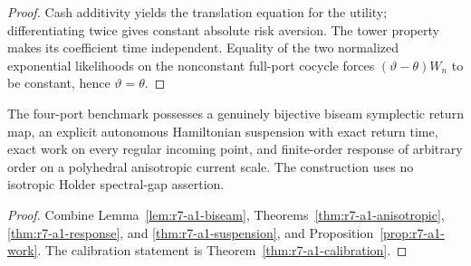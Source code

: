 \begin{proof}
Cash additivity yields the translation equation for the utility; differentiating
twice gives constant absolute risk aversion.  The tower property makes its
coefficient time independent.  Equality of the two normalized exponential
likelihoods on the nonconstant full-port cocycle forces
$(\vartheta-\theta)W_n$ to be constant, hence $\vartheta=\theta$.
\end{proof}

\begin{theorem}
\label{thm:r7-a1-main}
The four-port benchmark possesses a genuinely bijective biseam symplectic
return map, an explicit autonomous Hamiltonian suspension with exact return
time, exact work on every regular incoming point, and finite-order response of
arbitrary order on a polyhedral anisotropic current scale.  The construction
uses no isotropic Holder spectral-gap assertion.
\end{theorem}

\begin{proof}
Combine Lemma~\ref{lem:r7-a1-biseam},
Theorems~\ref{thm:r7-a1-anisotropic},
\ref{thm:r7-a1-response}, and
\ref{thm:r7-a1-suspension}, and
Proposition~\ref{prop:r7-a1-work}.  The calibration statement is
Theorem~\ref{thm:r7-a1-calibration}.
\end{proof}
